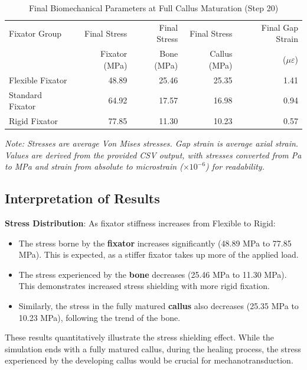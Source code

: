 \documentclass{article}
\begin{document}
\begin{table}[h!]
  \centering
  \caption{Final Biomechanical Parameters at Full Callus Maturation (Step 20)}
  \label{tab:final_results}
  \begin{tabular}{lrrrr}
    \toprule
    Fixator Group    & Final Stress  & Final Stress & Final Stress & Final Gap Strain   \\
                     & Fixator (MPa) & Bone (MPa)   & Callus (MPa) & ($\mu\varepsilon$) \\
    \midrule
    Flexible Fixator & 48.89         & 25.46        & 25.35        & 1.41               \\
    Standard Fixator & 64.92         & 17.57        & 16.98        & 0.94               \\
    Rigid Fixator    & 77.85         & 11.30        & 10.23        & 0.57               \\
    \bottomrule
  \end{tabular}


  \footnotesize{\textit{Note: Stresses are average Von Mises stresses. Gap strain is average axial strain. Values are derived from the provided CSV output, with stresses converted from Pa to MPa and strain from absolute to microstrain ($\times 10^{-6}$) for readability.}}
\end{table}

\subsection{Interpretation of Results}

\textbf{Stress Distribution}:
As fixator stiffness increases from Flexible to Rigid:
\begin{itemize}
  \item The stress borne by the \textbf{fixator} increases significantly (48.89 MPa to 77.85 MPa). This is expected, as a stiffer fixator takes up more of the applied load.
  \item The stress experienced by the \textbf{bone} decreases (25.46 MPa to 11.30 MPa). This demonstrates increased stress shielding with more rigid fixation.
  \item Similarly, the stress in the fully matured \textbf{callus} also decreases (25.35 MPa to 10.23 MPa), following the trend of the bone.
\end{itemize}
These results quantitatively illustrate the stress shielding effect. While the simulation ends with a fully matured callus, during the healing process, the stress experienced by the developing callus would be crucial for mechanotransduction.
\end{document}
